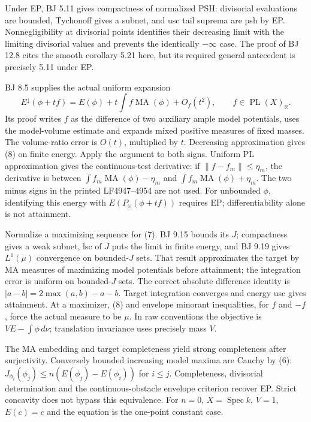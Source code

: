 \documentclass[
  11pt,
]{article}
\begin{document}
Under EP, BJ 5.11 gives compactness of normalized PSH: divisorial
evaluations are bounded, Tychonoff gives a subnet, and usc tail suprema
are psh by EP. Nonnegligibility at divisorial points identifies their
decreasing limit with the limiting divisorial values and prevents the
identically \(-\infty\) case. The proof of BJ 12.8 cites the smooth
corollary 5.21 here, but its required general antecedent is precisely
5.11 under EP.

BJ 8.5 supplies the actual uniform expansion \[
 E^\downarrow(\phi+tf)=E(\phi)+t\int f\operatorname{MA}(\phi)+O_f(t^2),
 \qquad f\in\operatorname{PL}(X)_{\mathbb R}.
 \tag{8}
\] Its proof writes \(f\) as the difference of two auxiliary ample model
potentials, uses the model-volume estimate and expands mixed positive
measures of fixed masses. The volume-ratio error is \(O(t)\), multiplied
by \(t\). Decreasing approximation gives (8) on finite energy. Apply the
argument to both signs. Uniform PL approximation gives the
continuous-test derivative: if \(\|f-f_m\|\le\eta_m\), the derivative is
between \(\int f_m\operatorname{MA}(\phi)-\eta_m\) and
\(\int f_m\operatorname{MA}(\phi)+\eta_m\). The two minus signs in the
printed LF4947--4954 are not used. For unbounded \(\phi\), identifying
this energy with \(E(P_\omega(\phi+tf))\) requires EP; differentiability
alone is not attainment.

Normalize a maximizing sequence for (7). BJ 9.15 bounds its \(J\);
compactness gives a weak subnet, lsc of \(J\) puts the limit in finite
energy, and BJ 9.19 gives \(L^1(\mu)\) convergence on bounded-\(J\)
sets. That result approximates the target by MA measures of maximizing
model potentials before attainment; the integration error is uniform on
bounded-\(J\) sets. The correct absolute difference identity is
\(|a-b|=2\max(a,b)-a-b\). Target integration converges and energy usc
gives attainment. At a maximizer, (8) and envelope minorant
inequalities, for \(f\) and \(-f\), force the actual measure to be
\(\mu\). In raw conventions the objective is \(VE-\int\phi\,d\nu\);
translation invariance uses precisely mass \(V\).

The MA embedding and target completeness yield strong completeness after
surjectivity. Conversely bounded increasing model maxima are Cauchy by
(6): \(J_{\phi_i}(\phi_j)\le n(E(\phi_j)-E(\phi_i))\) for \(i\le j\).
Completeness, divisorial determination and the continuous-obstacle
envelope criterion recover EP. Strict concavity does not bypass this
equivalence. For \(n=0\), \(X=\operatorname{Spec}k\), \(V=1\),
\(E(c)=c\) and the equation is the one-point constant case.
\end{document}
